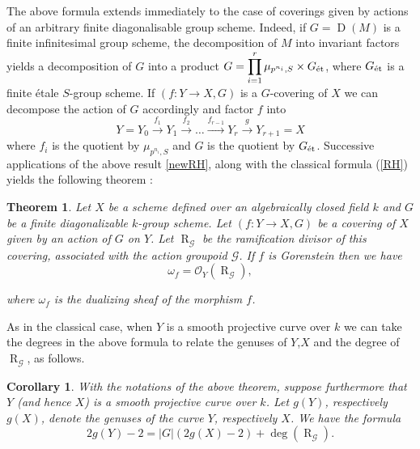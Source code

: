 \documentclass{amsart}
\newtheorem{theo}{Theorem}[section]
\newtheorem{coro}{Corollary}[section]
\theoremstyle{definition}
\theoremstyle{remark}
\begin{document}
The above formula extends immediately to the case of coverings given by actions of an arbitrary finite diagonalisable group scheme. Indeed, if $G = \operatorname{D}(M)$ is a finite  infinitesimal group scheme, the decomposition of $M$ into invariant factors yields a decomposition of $G$ into a product $G = \displaystyle\prod\limits_{i=1}^r \mu_{p^{n_i},S} \times G_{\textup{\'et}}$, where $G_{\textup{\'et}}$ is a finite \'etale $S$-group scheme. If $(f : Y {\longrightarrow} X, G)$ is a $G$-covering of $X$ we can decompose the action of $G$ accordingly and factor $f$ into \[Y=Y_0 \stackrel{f_1}{\longrightarrow} Y_1 \stackrel{f_2}{\longrightarrow} \dots \stackrel{f_{r-1}}{\longrightarrow} Y_r \stackrel{g}{\longrightarrow} Y_{r+1}=X \] where $f_i$ is the quotient by $\mu_{p^{n_i},S}$ and $G$ is the quotient by $G_{\textup{\'et}}$. Successive applications of the above result \ref{newRH}, along with the classical formula (\ref{RH}) yields the following theorem :      

\begin{theo}

\label{newnRH}
Let $X$ be a scheme defined over an algebraically closed field $k$ and $G$ be a finite diagonalizable $k$-group scheme. Let $(f : Y {\longrightarrow} X, G)$ be a covering of $X$ given by an action of $G$ on $Y$. Let $\operatorname{R}_{{\mathcal G}}$ be the ramification divisor of this covering, associated with the action groupoid ${{\mathcal G}}$.  If $f$ is Gorenstein then we have \[\omega_f = {{\mathcal O}}_Y(\operatorname{R}_{{\mathcal G}}), \]

where $\omega_f$ is the dualizing sheaf of the morphism $f$.

\end{theo}

As in the classical case, when $Y$ is a smooth projective curve over $k$ we can take the degrees in the above formula to relate the genuses of $Y$,$X$ and the degree of $\operatorname{R}_{{\mathcal G}}$, as follows.

\begin{coro}

With the notations of the above theorem, suppose furthermore that $Y$ (and hence $X$) is a smooth projective curve over $k$. Let $g(Y)$, respectively $g(X)$, denote the genuses of the curve $Y$, respectively $X$. We have the formula \[ 2g(Y) - 2 =    \vert G \vert (2g(X)-2) + \deg(\operatorname{R}_{{\mathcal G}}). \]

\end{coro}
\end{document}

